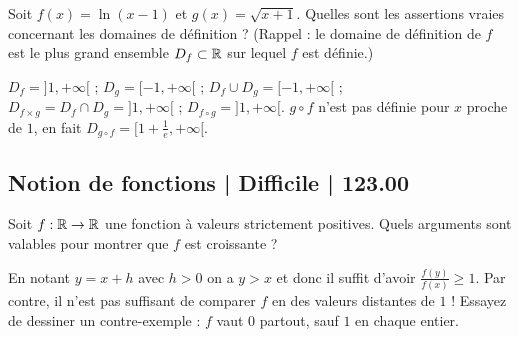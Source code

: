 \begin{question}

Soit $f(x) = \ln(x-1)$ et $g(x) = \sqrt{x+1}$. 
Quelles sont les assertions vraies concernant les domaines de définition ? (Rappel : le domaine de définition de $f$ est le plus grand ensemble $D_f \subset \mathbb{R}$ sur lequel $f$ est définie.)
\begin{answers}
    \good{$D_f \cup D_g = [-1,+\infty[$.}

    \bad{Pour la composition $f \circ g$, $D_{f\circ g} = [-1,+\infty[$.}

    \bad{Pour la composition $g \circ f$, $D_{g\circ f} = ]1,+\infty[$.}

    \good{Pour la fonction $f \times g$, $D_{f\times g} = ]1,+\infty[$.}   
\end{answers}
\begin{explanations}
$D_f = ]1,+\infty[$ ; $D_g = [-1,+\infty[$ ; 
$D_f \cup D_g = [-1,+\infty[$ ;
$D_{f \times g} = D_f \cap D_g = ]1,+\infty[$ ;
$D_{f \circ g} = ]1,+\infty[$.
$g \circ f$ n'est pas définie pour $x$ proche de $1$, en fait 
$D_{g\circ f} = [1+\frac1e,+\infty[$.
\end{explanations}
\end{question}



\subsection{Notion de fonctions | Difficile | 123.00}


\begin{question}

Soit $f : \mathbb{R} \to \mathbb{R}$ une fonction à valeurs strictement positives. Quels arguments sont valables pour montrer que $f$ est croissante ?
\begin{answers}



   
\end{answers}
\begin{explanations}
En notant $y = x+h$ avec $h>0$ on a $y > x$ et donc il suffit d'avoir $\frac{f(y)}{f(x)} \ge 1$.
Par contre, il n'est pas suffisant de comparer $f$ en des valeurs distantes de $1$ ! Essayez de dessiner un contre-exemple : $f$ vaut $0$ partout, sauf $1$ en chaque entier.

\end{explanations}
\end{question}


